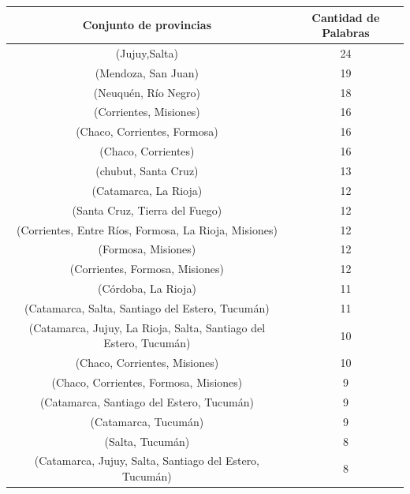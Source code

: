 \begin{table}[]
\centering
\label{tab:regiones}
\begin{tabular}{|c|c|}
\hline
Conjunto de provincias                                 & Cantidad de Palabras  \\ \hline
(Jujuy,Salta)                                          & 24          \\
(Mendoza, San Juan)                                    & 19          \\
(Neuquén, Río Negro)                                   & 18          \\
(Corrientes, Misiones)                                 & 16          \\
(Chaco, Corrientes, Formosa)                           & 16          \\
(Chaco, Corrientes)                                    & 16          \\
(chubut, Santa Cruz)                                   & 13          \\
(Catamarca, La Rioja)                                  & 12          \\
(Santa Cruz, Tierra del Fuego)                         & 12          \\
(Corrientes, Entre Ríos, Formosa, La Rioja, Misiones)  & 12          \\  %
(Formosa, Misiones)                                    & 12          \\
(Corrientes, Formosa, Misiones)                        & 12          \\
(Córdoba, La Rioja)                                    & 11          \\
(Catamarca, Salta, Santiago del Estero, Tucumán)       & 11          \\
(Catamarca, Jujuy, La Rioja, Salta, Santiago del Estero, Tucumán) & 10          \\
(Chaco, Corrientes, Misiones)                          & 10          \\
(Chaco, Corrientes, Formosa, Misiones)                 & 9           \\
(Catamarca, Santiago del Estero, Tucumán)              & 9           \\
(Catamarca, Tucumán)                                   & 9           \\
(Salta, Tucumán)                                       & 8           \\
(Catamarca, Jujuy, Salta, Santiago del Estero, Tucumán)& 8           \\

\end{tabular}
\end{table}
